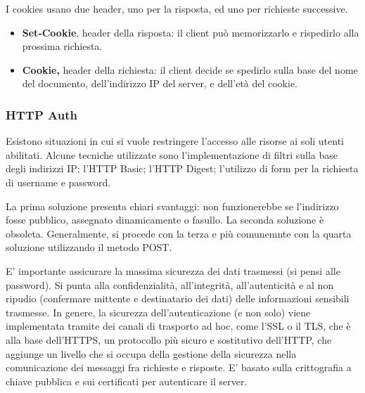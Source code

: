 \vspace{3mm}

I cookies usano due header, uno per la risposta, ed uno per richieste successive. 

\begin{itemize}
    \item
    \textbf{Set-Cookie}, header della risposta: il client può memorizzarlo e rispedirlo alla prossima richiesta.
    
    \item
    \textbf{Cookie,} header della richiesta: il client decide
    se spedirlo sulla base del nome del documento, dell’indirizzo IP del server, e dell’età del cookie.
\end{itemize}

\subsubsection{HTTP Auth}

Esistono situazioni in cui si vuole restringere l’accesso alle risorse ai soli utenti abilitati. Alcune tecniche utilizzate sono l'implementazione di filtri sulla base degli indirizzi IP; l'HTTP Basic; l'HTTP Digest; l'utilizzo di form per la richiesta di username e password.

\vspace{3mm}

La prima soluzione presenta chiari svantaggi: non funzionerebbe se l'indirizzo fosse pubblico, assegnato dinamicamente o fasullo. La seconda soluzione è obsoleta. Generalmente, si procede con la terza e più comunemnte con la quarta soluzione utilizzando il metodo POST.

\vspace{3mm}

E' importante assicurare la massima sicurezza dei dati trasmessi (si pensi alle password). Si punta alla confidenzialità, all'integrità, all'autenticità e al non ripudio (confermare mittente e destinatario dei dati) delle informazioni sensibili trasmesse. In genere, la sicurezza dell'autenticazione (e non solo) viene implementata tramite dei canali di trasporto ad hoc, come l'SSL o il TLS, che è alla base dell'HTTPS, un protocollo più sicuro e sostitutivo dell'HTTP, che aggiunge un livello che si occupa della gestione della sicurezza nella comunicazione dei messaggi fra richieste e risposte. E' basato sulla crittografia a chiave pubblica e sui certificati per autenticare il server.

\vspace{3mm}


